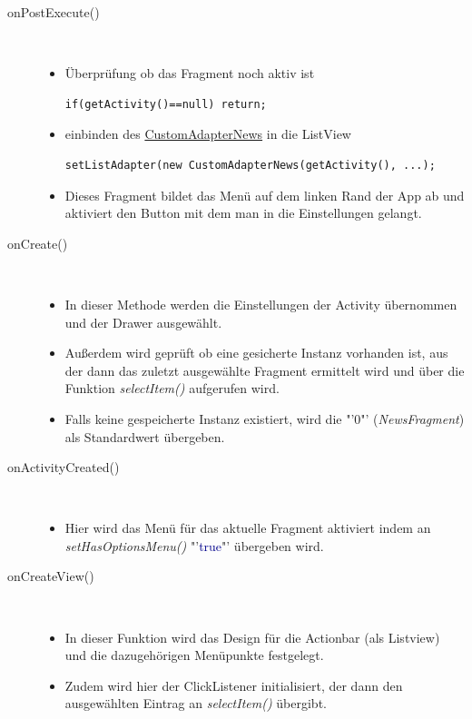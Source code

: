 \begin{description}
\item[onPostExecute()]~\par
\begin{itemize}
\item  Überprüfung ob das Fragment noch aktiv ist
\begin{lstlisting}
if(getActivity()==null) return;
\end{lstlisting}
\item einbinden des \hyperref[CustomAdapterNews]{CustomAdapterNews} in die ListView
\begin{lstlisting}
setListAdapter(new CustomAdapterNews(getActivity(), ...);
\end{lstlisting}
\end{itemize}
\newpage
{}\label{NavigationDrawerFragment}
\begin{itemize}
\item Dieses Fragment bildet das Menü auf dem linken Rand der App ab und aktiviert den Button mit dem man in die Einstellungen gelangt.
\end{itemize}

\item[onCreate()]~\par
\begin{itemize}
\item In dieser Methode werden die Einstellungen der Activity übernommen und der Drawer ausgewählt. 
\item Außerdem wird geprüft ob eine gesicherte Instanz vorhanden ist, aus der dann das zuletzt ausgewählte Fragment ermittelt wird und über die Funktion \textit{selectItem()} aufgerufen wird. 
\item Falls keine gespeicherte Instanz existiert, wird die "'0"' (\textit{NewsFragment}) als Standardwert übergeben.
\end{itemize}
 
\item[onActivityCreated()]~\par
\begin{itemize}
\item Hier wird das Menü für das aktuelle Fragment aktiviert indem an \textit{setHasOptionsMenu()} "'\textcolor{darkblue}{true}"' übergeben wird.
\end{itemize} 
\item[onCreateView()]~\par
\begin{itemize}
\item In dieser Funktion wird das Design für die Actionbar (als Listview) und die dazugehörigen Menüpunkte festgelegt. 
\item Zudem wird hier der ClickListener initialisiert, der dann den ausgewählten Eintrag an \textit{selectItem()} übergibt.
\end{itemize}


\end{description}
